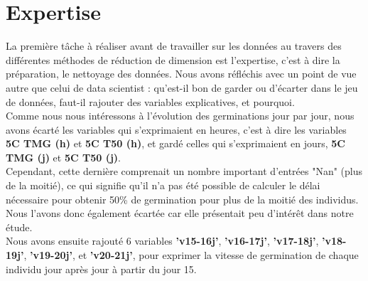 \documentclass[12pt]{report}
\begin{document}
\section{Expertise}

La première tâche à réaliser avant de travailler sur les données au travers des différentes méthodes de réduction de dimension est l'expertise, c'est à dire la préparation, le nettoyage des données. Nous avons réfléchis avec un point de vue
autre que celui de data scientist : qu'est-il bon de garder ou d'écarter dans le jeu de données, faut-il rajouter des variables explicatives, et pourquoi.\\

Comme nous nous intéressons à l'évolution des germinations jour par jour, nous avons écarté les variables qui s'exprimaient en heures, c'est à dire les variables \textbf{5\textdegree C TMG (h)} et \textbf{5\textdegree C T50 (h)}, et gardé celles qui s'exprimaient en jours, \textbf{5\textdegree C TMG (j)} et \textbf{5\textdegree C T50 (j)}.\\
Cependant, cette dernière comprenait un nombre important d'entrées "Nan" (plus de la moitié), ce qui signifie qu'il n'a pas été possible de calculer le délai nécessaire pour obtenir 50\% de germination pour plus de la moitié des individus. Nous l'avons donc également écartée car elle présentait peu d'intérêt dans notre étude.\\

Nous avons ensuite rajouté 6 variables \textbf{'v15-16j'}, \textbf{'v16-17j'}, \textbf{'v17-18j'}, \textbf{'v18-19j'}, \textbf{'v19-20j'}, et \textbf{'v20-21j'},  pour exprimer la vitesse de germination de chaque individu jour après jour à partir du jour 15.
\end{document}
